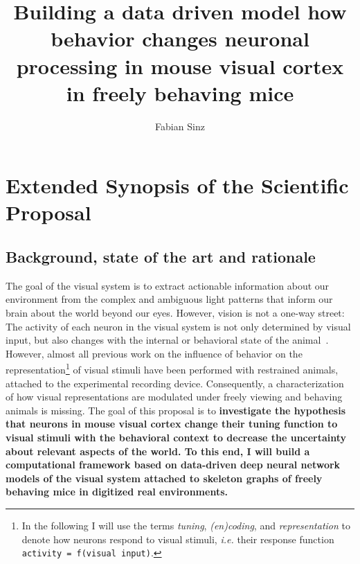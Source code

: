 \documentclass[COG,11pt]{ercgrant}
\author{Fabian Sinz}
\title{Building a data driven model how behavior changes neuronal processing in mouse visual cortex in freely behaving mice}
\begin{document}
\maketitle

\begin{abstract}
	\textcolor{red}{
		
	}
\end{abstract}



\section{Extended Synopsis of the Scientific Proposal}

\subsection{Background, state of the art and rationale}
The goal of the visual system is to extract actionable information about our environment from the complex and ambiguous light patterns that inform our brain about the world beyond our eyes.
However, vision is not a one-way street: The activity of each neuron in the visual system is not only determined by visual input, but also changes with the internal or behavioral state of the animal~\parencite{Niell2010-bs, Musall2019-kd, Erisken2014-un, Franke2022-do}. 
However, almost all previous work on the influence of behavior on the representation\footnote{In the following I will use the terms \textit{tuning}, \textit{(en)coding}, and \textit{representation} to denote how neurons respond to visual stimuli, \textit{i.e.} their response function \texttt{activity = f(visual input)}.} of visual stimuli have been performed with restrained animals, attached to the experimental recording device.
Consequently, a characterization of how visual representations are modulated under freely viewing and behaving animals is missing. 
The goal of this proposal is to \textbf{investigate the hypothesis that neurons in mouse visual cortex change their tuning function to visual stimuli with the behavioral context to decrease the uncertainty about relevant aspects of the world. To this end, I will build a computational framework based on data-driven deep neural network models of the visual system attached to skeleton graphs of freely behaving mice in digitized real environments.} 
\end{document}
